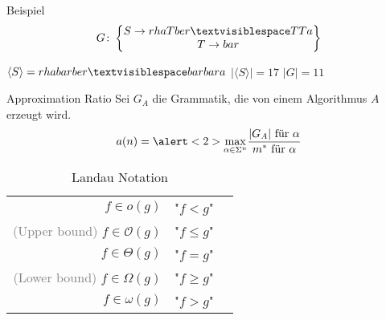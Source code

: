 \begin{frame}{\FrameName}
\begin{block}{Beispiel}
	$$
	G \colon \begin{Bmatrix} 
		S \rightarrow rhaTber \textvisiblespace TTa \\
		T \rightarrow bar
	\end{Bmatrix}
	$$
	
	$\langle S \rangle = rhabarber \textvisiblespace barbara$ \linebreak
	$| \langle S \rangle| = 17$ \linebreak
	$\lvert G \lvert = 11$
\end{block}
\end{frame}

\begin{frame}{\FrameName}
\begin{block}{Approximation Ratio}
	\Gap
	Sei $G_A$ die Grammatik, die von einem Algorithmus $A$ erzeugt wird.
	$$
	a(n) = \alert<2>{\max\limits_{\alpha \in \Sigma^n}}\frac{
		\textrm{$\lvert G_A \lvert$ für $\alpha$}
	}{
		\textrm{$m^*$ für $\alpha$}
	}
	$$
	
\end{block}
\end{frame}

\begin{frame}{\FrameName}
\begin{table}
	\caption{Landau Notation}
	\begin{tabular}{ r p{3.5cm} l}
		
		$f \in o(g)$ & "$f < g$" \\
		\textcolor{gray}{(Upper bound)} $f \in \mathcal{O}(g)$ & "$f\leq g$" \\
		$f \in \Theta(g)$ & "$f = g$"\\
		\textcolor{gray}{(Lower bound)} $f \in \Omega(g)$ & "$f \geq g$"\\
		$f \in \omega(g)$ & "$f > g$"\\
	\end{tabular}
\end{table}
\end{frame}